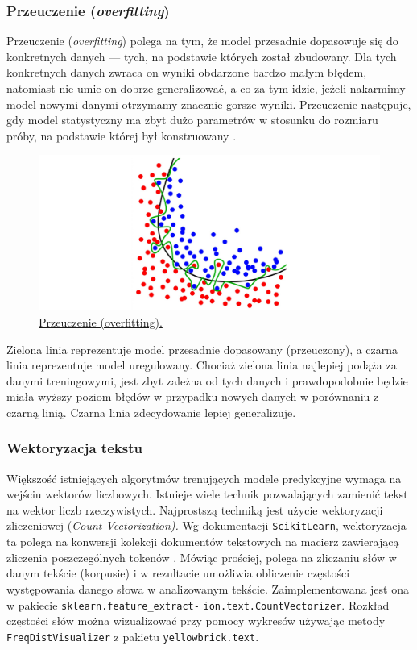 \subsubsection{Przeuczenie (\textit{overfitting})}
Przeuczenie (\textit{overfitting}) polega na tym, że model przesadnie dopasowuje się do konkretnych danych --- tych, na podstawie których został zbudowany. Dla tych konkretnych danych zwraca on wyniki obdarzone bardzo małym błędem, natomiast nie umie on dobrze generalizować, a co za tym idzie, jeżeli nakarmimy model nowymi danymi otrzymamy znacznie gorsze wyniki. Przeuczenie następuje, gdy model statystyczny ma zbyt dużo parametrów w stosunku do rozmiaru próby, na podstawie której był konstruowany \cite{overfitting}.

\begin{figure}[H]
	\centering
	\includegraphics[width=0.95\linewidth]{images/chapter1/overfitting.pdf}
	\caption{\href{https://upload.wikimedia.org/wikipedia/commons/1/19/Overfitting.svg}{Przeuczenie (overfitting).}}
	\label{fig:overfitting}
\end{figure}

\noindent Zielona linia reprezentuje model przesadnie dopasowany (przeuczony), a czarna linia reprezentuje model uregulowany. Chociaż zielona linia najlepiej podąża za danymi treningowymi, jest zbyt zależna od tych danych i prawdopodobnie będzie miała wyższy poziom błędów w przypadku nowych danych w porównaniu z czarną linią. Czarna linia zdecydowanie lepiej generalizuje.



\subsubsection{Wektoryzacja tekstu}
Większość istniejących algorytmów trenujących modele predykcyjne wymaga na wejściu wektorów liczbowych. Istnieje wiele technik pozwalających zamienić tekst na wektor liczb rzeczywistych. Najprostszą techniką jest użycie wektoryzacji zliczeniowej (\textit{Count Vectorization).} Wg dokumentacji \verb|ScikitLearn|, wektoryzacja ta polega na konwersji kolekcji dokumentów tekstowych na macierz zawierającą zliczenia poszczególnych tokenów \cite{countVectorizer}. Mówiąc prościej, polega na zliczaniu słów w danym tekście (korpusie) i w rezultacie umożliwia obliczenie częstości występowania danego słowa w analizowanym tekście. Zaimplementowana jest ona w pakiecie \verb|sklearn.feature_extract-| \verb|ion.text.CountVectorizer|. Rozkład częstości słów można wizualizować przy pomocy wykresów używając metody \verb|FreqDistVisualizer| z pakietu \verb|yellowbrick.text|.\\
